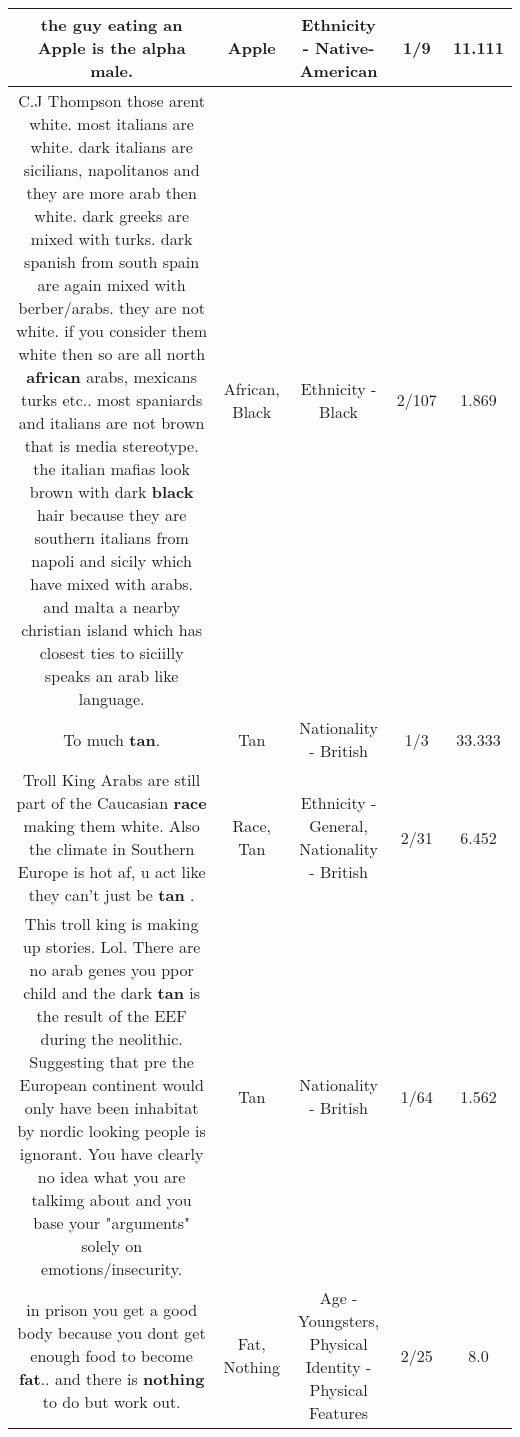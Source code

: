 \documentclass[11pt]{article}
\newlength\mylength
\begin{document}
\begin{center}
\begin{longtable}{|C{.65\mylength}|C{.30\mylength}|C{.12\mylength}|C{.12\mylength}|C{.12\mylength}|}
  \small the guy eating an \textbf{Apple} is the alpha male.\normalsize   & Apple & Ethnicity - Native-American & 1/9 & 11.111 \\  \hline
  \small C.J Thompson those arent white. most italians are white. dark italians are sicilians, napolitanos and they are more arab then white. dark greeks are mixed with turks. dark spanish from south spain are again mixed with berber/arabs. they are not white. if you consider them white then so are all north \textbf{african} arabs, mexicans turks etc.. most spaniards and italians are not brown that is media stereotype. the italian mafias look brown with dark \textbf{black} hair  because they are southern italians from napoli and sicily which have mixed with arabs. and malta a nearby christian island  which has closest ties to siciilly speaks an arab like language.\normalsize   & African, Black & Ethnicity - Black & 2/107 & 1.869 \\  \hline
  \small To much \textbf{tan}.\normalsize   & Tan & Nationality - British & 1/3 & 33.333 \\  \hline
  \small Troll King Arabs are still part of the Caucasian \textbf{race} making them white. Also the climate in Southern Europe is hot af, u act like they can't just be \textbf{tan} .\normalsize   & Race, Tan & Ethnicity - General, Nationality - British & 2/31 & 6.452 \\  \hline
  \small This troll king is making up stories. Lol. There are no arab genes you ppor child and the dark \textbf{tan} is the result of the EEF during the neolithic. Suggesting that pre the European continent would only have been inhabitat by nordic looking people is ignorant. You have clearly no idea what you are talkimg about and you base your "arguments" solely on emotions/insecurity.\normalsize   & Tan & Nationality - British & 1/64 & 1.562 \\  \hline
  \small in prison you get a good body because you dont get enough food to become \textbf{fat}.. and there is \textbf{nothing} to do but work out.\normalsize   & Fat, Nothing & Age - Youngsters, Physical Identity - Physical Features & 2/25 & 8.0 \\  \hline

\end{longtable}
\end{center}
\end{document}
